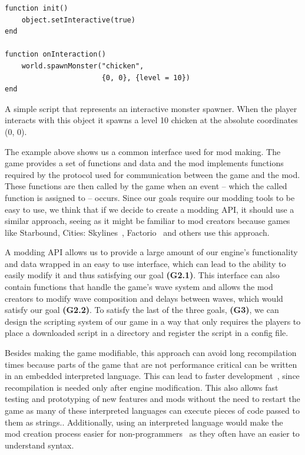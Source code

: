 \begin{listing}[H]
    \centering
    \begin{lstlisting}
function init()
    object.setInteractive(true)
end

function onInteraction()
    world.spawnMonster("chicken",
                       {0, 0}, {level = 10})
end
    \end{lstlisting}
    \caption{A simple script that represents an interactive monster spawner. When the player interacts
            with this object it spawns a level 10 chicken at the absolute coordinates (0, 0).}
    \label{sb-lua-mod-ex}
\end{listing}

The example above shows us a common interface used for mod making. The game provides a set of functions and data and the mod implements
functions required by the protocol used for communication between the game and the mod. These functions are then called by the game
when an event -- which the called function is assigned to -- occurs. Since our goals require our modding tools to be easy to use,
we think that if we decide to create a modding API, it should use a similar approach, seeing as it might be familiar to mod
creators because games like Starbound, Cities: Skylines~\cite{Skylines}, Factorio~\cite{Factorio} and others use this approach.

A modding API allows us to provide a large amount of our engine's functionality and data wrapped in an easy to use interface, which can lead
to the ability to easily modify it and thus satisfying our goal \textbf{(G2.1)}. This interface can also contain functions that handle the
game's wave system and allows the mod creators to modify wave composition and delays between waves, which would satisfy our goal
\textbf{(G2.2)}. To satisfy the last of the three goals, \textbf{(G3)}, we can design the scripting system of our game in a way that only
requires the players to place a downloaded script in a directory and register the script in a config file.

Besides making the game modifiable, this approach can avoid long recompilation times because parts of the game that are not performance
critical can be written in an embedded interpreted language. This can lead to faster development~\cite{GEA}, since recompilation is
needed only after engine modification. This also allows fast testing and prototyping of new features and mods without the need
to restart the game as many of these interpreted languages can execute pieces of code passed to them as strings..
Additionally, using an interpreted language would make the mod creation process easier for non-programmers~\cite{WhyScripting} as
they often have an easier to understand syntax.

